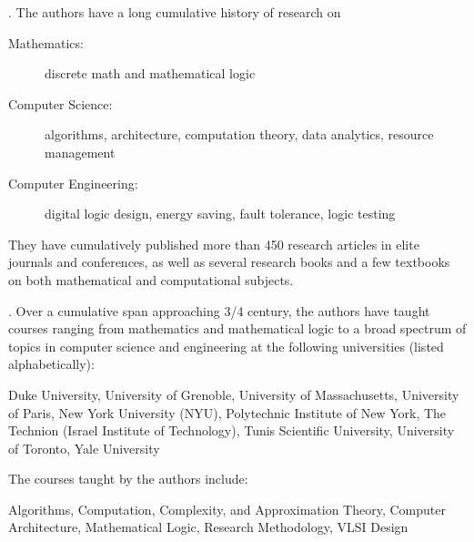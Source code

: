 \documentclass{article}[12pt]
\begin{document}
\bigskip


\medskip

.
The authors have a long cumulative history of research on
\begin{description}
\item[{\sf Mathematics:}]
discrete math and mathematical logic
\item[{\sf Computer Science:}]
algorithms, architecture, computation theory, data analytics, resource management
\item[{\sf Computer Engineering:}]
digital logic design, energy saving, fault tolerance, logic testing
\end{description}

\smallskip

\noindent
They have cumulatively published more than 450 research articles in elite journals and conferences, as well as several research books and a few textbooks on both mathematical and computational subjects.  %

\bigskip

.
Over a cumulative span approaching 3/4 century, the authors have taught courses ranging from mathematics and mathematical logic to a broad spectrum of topics in computer science and engineering at the following universities (listed alphabetically):

\smallskip

\noindent
Duke University, 
University of Grenoble,
University of Massachusetts,
University of Paris,
New York University (NYU),
Polytechnic Institute of New York,
The Technion (Israel Institute of Technology),
Tunis Scientific University,
University of Toronto,
Yale University

\medskip

\noindent
The courses taught by the authors include:

\smallskip

\noindent
Algorithms,
Computation, Complexity, and Approximation Theory,
Computer Architecture,
Mathematical Logic,
Research Methodology,
VLSI Design
\end{document}
